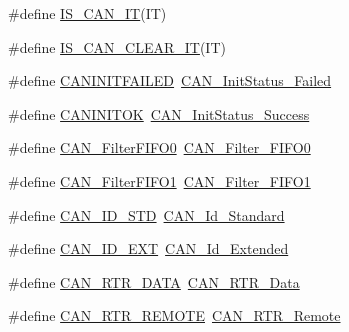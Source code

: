 \begin{DoxyCompactItemize}
\item 
\#define \hyperlink{group___c_a_n__interrupts_ga062e922c41d2729fc37257167de93302}{I\+S\+\_\+\+C\+A\+N\+\_\+\+IT}(IT)            
\item 
\#define \hyperlink{group___c_a_n__interrupts_ga8b6e5fd6ddfe0141925f1e22cfbe7b85}{I\+S\+\_\+\+C\+A\+N\+\_\+\+C\+L\+E\+A\+R\+\_\+\+IT}(IT)
\item 
\#define \hyperlink{group___c_a_n___legacy_ga0539a9e5a898fcd71c4dcb7e341e4b86}{C\+A\+N\+I\+N\+I\+T\+F\+A\+I\+L\+ED}~\hyperlink{group___c_a_n__sleep__constants_ga095c319e8c54c974eb2b6eeadf180d96}{C\+A\+N\+\_\+\+Init\+Status\+\_\+\+Failed}
\item 
\#define \hyperlink{group___c_a_n___legacy_ga14cba0b5b506be73e2f45c732f8e54cb}{C\+A\+N\+I\+N\+I\+T\+OK}~\hyperlink{group___c_a_n__sleep__constants_ga6bed5957af8f2f6b00568e15ccac5772}{C\+A\+N\+\_\+\+Init\+Status\+\_\+\+Success}
\item 
\#define \hyperlink{group___c_a_n___legacy_ga1b3d041dff9fed4dad75ed2a4a0e27e0}{C\+A\+N\+\_\+\+Filter\+F\+I\+F\+O0}~\hyperlink{group___c_a_n__filter___f_i_f_o_ga8249c27978ca94676530540b88a6be8f}{C\+A\+N\+\_\+\+Filter\+\_\+\+F\+I\+F\+O0}
\item 
\#define \hyperlink{group___c_a_n___legacy_gada8f9b3a9c88f36539aaeb457039e666}{C\+A\+N\+\_\+\+Filter\+F\+I\+F\+O1}~\hyperlink{group___c_a_n__filter___f_i_f_o_gaab8478c89a607c4b8baf68efc730e316}{C\+A\+N\+\_\+\+Filter\+\_\+\+F\+I\+F\+O1}
\item 
\#define \hyperlink{group___c_a_n___legacy_ga284ca16658deb9d0c21f4ddc6db14833}{C\+A\+N\+\_\+\+I\+D\+\_\+\+S\+TD}~\hyperlink{group___c_a_n__identifier__type_ga151d9df8a6f361d0a3231593726b5a13}{C\+A\+N\+\_\+\+Id\+\_\+\+Standard}
\item 
\#define \hyperlink{group___c_a_n___legacy_ga5f6fdd1dc3d312af1ac30e2eee15d6f0}{C\+A\+N\+\_\+\+I\+D\+\_\+\+E\+XT}~\hyperlink{group___c_a_n__identifier__type_gaf6c5c0b43b968fed17fd90246912b1a7}{C\+A\+N\+\_\+\+Id\+\_\+\+Extended}
\item 
\#define \hyperlink{group___c_a_n___legacy_gab1e89074b4fcfebf81c323909625b0d0}{C\+A\+N\+\_\+\+R\+T\+R\+\_\+\+D\+A\+TA}~\hyperlink{group___c_a_n__remote__transmission__request_ga2407c3a8b2cd97bd651143aa959219f1}{C\+A\+N\+\_\+\+R\+T\+R\+\_\+\+Data}
\item 
\#define \hyperlink{group___c_a_n___legacy_gab15c649e3e497c6d1145bb98ff7f3f04}{C\+A\+N\+\_\+\+R\+T\+R\+\_\+\+R\+E\+M\+O\+TE}~\hyperlink{group___c_a_n__remote__transmission__request_ga42e95ddfb02d88c82de84058fb0fb349}{C\+A\+N\+\_\+\+R\+T\+R\+\_\+\+Remote}

\end{DoxyCompactItemize}
